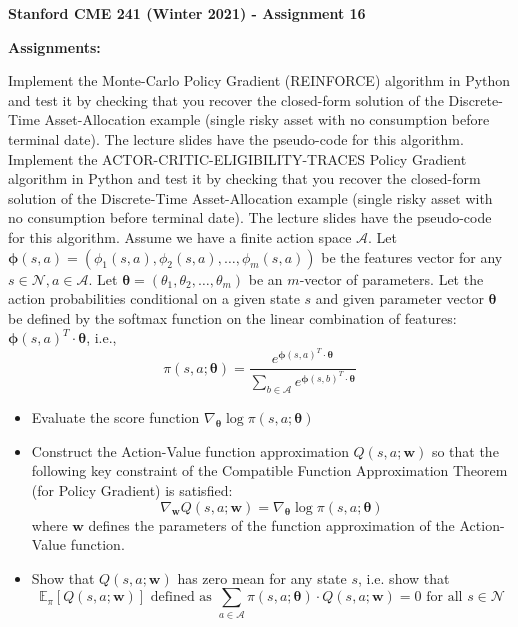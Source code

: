 \documentclass[12pt]{exam}
\begin{document}
\begin{center}
{\large {\bf Stanford CME 241 (Winter 2021) - Assignment 16}}
\end{center}
 
{\large{\bf Assignments:}}
\begin{questions}
 Implement the Monte-Carlo Policy Gradient (REINFORCE) algorithm in Python and test it by checking that you recover the closed-form solution of the Discrete-Time Asset-Allocation example (single risky asset with no consumption before terminal date). The lecture slides have the pseudo-code for this algorithm.
 Implement the ACTOR-CRITIC-ELIGIBILITY-TRACES Policy Gradient algorithm in Python and test it by checking that you recover the closed-form solution of the Discrete-Time Asset-Allocation example (single risky asset with no consumption before terminal date). The lecture slides have the pseudo-code for this algorithm.
\question Assume we have a finite action space $\mathcal{A}$. Let $\bm{\phi}(s,a) = (\phi_1(s,a), \phi_2(s,a), \ldots, \phi_m(s,a))$ be the features vector for any $s \in \mathcal{N}, a \in \mathcal{A}$. Let $\bm{\theta} = (\theta_1, \theta_2, \ldots, \theta_m)$ be an $m$-vector of parameters. Let the action probabilities conditional on a given state $s$ and given parameter vector $\bm{\theta}$ be defined by the softmax function on the linear combination of features: $\bm{\phi}(s,a)^T \cdot \bm{\theta}$, i.e.,
$$\pi(s, a ; \bm{\theta}) = \frac {e^{\bm{\phi}(s,a)^T \cdot \bm{\theta}}} {\sum_{b \in \mathcal{A}} e^{\bm{\phi}(s,b)^T \cdot \bm{\theta}}}$$
\begin{itemize}
\item Evaluate the score function $\nabla_{\bm{\theta}} \log \pi(s, a ; \bm{\theta})$
\item Construct the Action-Value function approximation $Q(s,a; \bm{w})$ so that the following key constraint of the Compatible Function Approximation Theorem (for Policy Gradient) is satisfied:
 $$\nabla_{\bm{w}} Q(s,a;\bm{w}) = \nabla_{\bm{\theta}} \log \pi(s, a ; \bm{\theta})$$
 where $\bm{w}$ defines the parameters of the function approximation of the Action-Value function.
 \item Show that $Q(s,a ; \bm{w})$ has zero mean for any state $s$, i.e. show that
 $$\mathbb{E}_{\pi} [Q(s,a; \bm{w})] \mbox{ defined as } \sum_{a \in \mathcal{A}} \pi(s, a ; \bm{\theta}) \cdot Q(s,a ; \bm{w}) = 0 \text{ for all } s \in \mathcal{N}$$
\end{itemize}

\end{questions}
\end{document}
